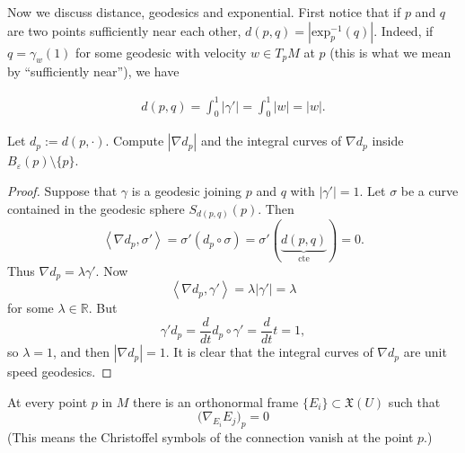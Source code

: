 \documentclass{book}
\begin{document}
\medskip\noindent
Now we discuss distance, geodesics and
exponential.
First notice that if $p$ and $q$ are two
points sufficiently near each other,
$d(p,q)=|\text{exp}^{-1}_p(q)|$.
Indeed, if $q=\gamma_w(1)$ for some geodesic
with
velocity $w \in T_pM$ at $p$ (this is what
we mean by ``sufficiently near''),
we have

$$
\begin{aligned}
d(p,q)=\int_0^1|\gamma'|=\int_0^1|w|=|w|.
\end{aligned}
$$

\begin{exercise}
\label{exercise-diffe-dista-funct}
Let $d_p:=d(p,\cdot)$. Compute $|\nabla d_p|$
and the integral
curves of $\nabla d_p$ inside
$B_\varepsilon(p)\setminus\{p\}$.
\end{exercise}

\begin{proof}
Suppose that $\gamma$ is a geodesic joining
$p$ and $q$
with $|\gamma'|=1$.
Let $\sigma$ be a curve contained in the
geodesic sphere $S_{d(p,q)}(p)$.
Then
$$
\left\langle{}\nabla d_p,\sigma'\right\rangle{}
=\sigma'(d_p\circ \sigma)
=\sigma'(\underbrace{d(p,q)}_{\text{cte}})=0.
$$
Thus $\nabla d_p=\lambda\gamma'$.
Now
$$
\left\langle{}\nabla d_p,\gamma'\right\rangle{}
=\lambda |\gamma'|=\lambda
$$
for some $\lambda \in \mathbb{R}$.
But
$$
\gamma'd_p=\frac{d}{dt}d_p \circ \gamma'
=\frac{d}{dt}t=1,
$$
so $\lambda=1$, and then $|\nabla d_p|=1$.
It is clear that the integral curves of
$\nabla d_p$
are unit speed geodesics.
\end{proof}

\begin{lemma}
\label{lemma-geodesic-coordinates}
At every point $p$ in $M$ there is an
orthonormal frame
$\{E_i\} \subset \mathfrak{X}(U)$ such that
\begin{equation}
\label{equation-norma-coord-vanis-chris}
\Big(\nabla_{E_i}E_j\Big)_p=0
\end{equation}
(This means the Christoffel symbols of the
connection vanish at the point $p$.)
\end{lemma}
\end{document}
